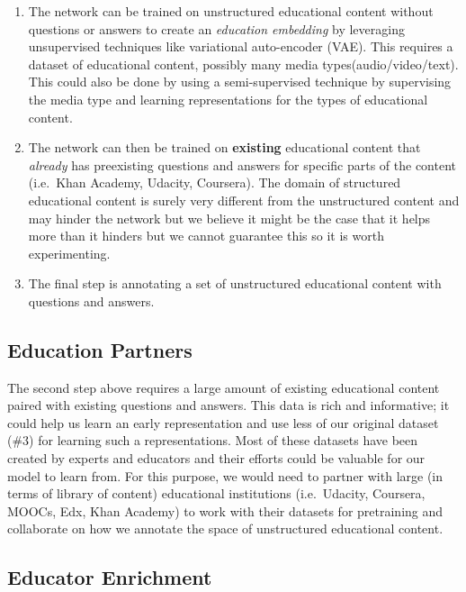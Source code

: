 \documentclass{acm_proc_article-sp}
\begin{document}
\begin{enumerate}
\def\labelenumi{\arabic{enumi}.}
\item
  The network can be trained on unstructured educational content without
  questions or answers to create an \emph{education embedding} by
  leveraging unsupervised techniques like variational auto-encoder
  (VAE). This requires a dataset of educational content, possibly many
  media types(audio/video/text). This could also be done by using a
  semi-supervised technique by supervising the media type and learning
  representations for the types of educational content.
\item
  The network can then be trained on \textbf{existing} educational
  content that \emph{already} has preexisting questions and answers for
  specific parts of the content (i.e.~Khan Academy, Udacity, Coursera).
  The domain of structured educational content is surely very different
  from the unstructured content and may hinder the network but we
  believe it might be the case that it helps more than it hinders but we
  cannot guarantee this so it is worth experimenting.
\item
  The final step is annotating a set of unstructured educational content
  with questions and answers.
\end{enumerate}

\subsection{Education Partners}\label{education-partners}

The second step above requires a large amount of existing educational
content paired with existing questions and answers. This data is rich
and informative; it could help us learn an early representation and use
less of our original dataset (\#3) for learning such a representations.
Most of these datasets have been created by experts and educators and
their efforts could be valuable for our model to learn from. For this
purpose, we would need to partner with large (in terms of library of
content) educational institutions (i.e.~Udacity, Coursera, MOOCs, Edx,
Khan Academy) to work with their datasets for pretraining and
collaborate on how we annotate the space of unstructured educational
content.

\subsection{Educator Enrichment}\label{educator-enrichment}
\end{document}
